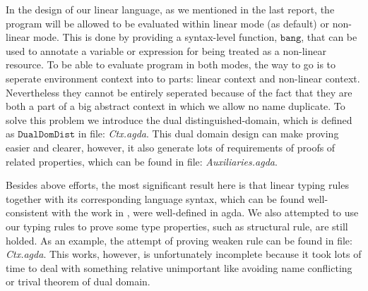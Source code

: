 \documentclass[a4paper,twocolumn]{article}
\begin{document}
\begin{prooftree}
\end{prooftree}
\begin{prooftree}
\end{prooftree}


In the design of our linear language, as we mentioned in the last report, the program will be allowed to be evaluated within linear mode (as default) or non-linear mode. This is done by providing a syntax-level function, $\mathtt{bang}$, that can be used to annotate a variable or expression for being treated as a non-linear resource. To be able to evaluate program in both modes, the way to go is to seperate environment context into to parts: linear context and non-linear context. Nevertheless they cannot be entirely seperated because of the fact that they are both a part of a big abstract context in which we allow no name duplicate. To solve this problem we introduce the dual distinguished-domain, which is defined as $\mathtt{DualDomDist}$ in file: \textit{Ctx.agda}\footnotemark[1]. This dual domain design can make proving easier and clearer, however, it also generate lots of requirements of proofs of related properties, which can be found in file: \textit{Auxiliaries.agda}\footnotemark[1].

Besides above efforts, the most significant result here is that linear typing rules together with its corresponding language syntax, which can be found well-consistent with the work in \cite{Wadler93}, were well-defined in agda. We also attempted to use our typing rules to prove some type properties, such as structural rule, are still holded. As an example, the attempt of proving weaken rule can be found in file: \textit{Ctx.agda}\footnotemark[1]. This works, however, is unfortunately incomplete because it took lots of time to deal with something relative unimportant like avoiding name conflicting or trival theorem of dual domain.
\end{document}
